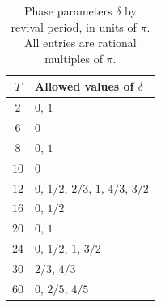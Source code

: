 \begin{table}[htbp]
\centering
\caption{Phase parameters $\delta$ by revival period, in units of
$\pi$. All entries are rational multiples of $\pi$.}
\label{tab:delta-by-period}
\begin{tabular}{cl}
\toprule
$T$ & Allowed values of $\delta$ \\
\midrule
$2$  & $0$, $1$ \\
$6$  & $0$ \\
$8$  & $0$, $1$ \\
$10$ & $0$ \\
$12$ & $0$, $1/2$, $2/3$, $1$, $4/3$, $3/2$ \\
$16$ & $0$, $1/2$ \\
$20$ & $0$, $1$ \\
$24$ & $0$, $1/2$, $1$, $3/2$ \\
$30$ & $2/3$, $4/3$ \\
$60$ & $0$, $2/5$, $4/5$ \\
\bottomrule
\end{tabular}
\end{table}
